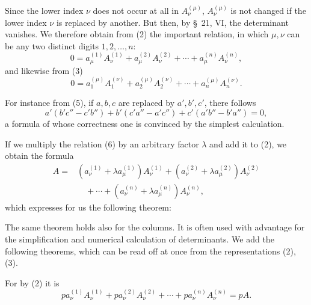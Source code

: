 
Since the lower index \(\nu\) does not occur at all in \(A_\nu^{(\mu)}\), \(A_\nu^{(\mu)}\) is not changed if the lower index \(\nu\) is replaced by another. But then, by \S~21, VI, the determinant vanishes. We therefore obtain from (2) the important relation, in which \(\mu,\nu\) can be any two distinct digits \(1,2,\ldots,n\):
\begin{equation}
0=a_\mu^{(1)}A_\nu^{(1)}+a_\mu^{(2)}A_\nu^{(2)}
 +\cdots+a_\mu^{(n)}A_\nu^{(n)},
\tag{6}
\end{equation}
and likewise from (3)
\begin{equation}
0=a_1^{(\mu)}A_1^{(\nu)}+a_2^{(\mu)}A_2^{(\nu)}
 +\cdots+a_n^{(\mu)}A_n^{(\nu)}.
\tag{7}
\end{equation}

For instance from (5), if \(a,b,c\) are replaced by \(a',b',c'\), there follows
\begin{equation}
 a'(b'c''-c'b'')+b'(c'a''-a'c'')+c'(a'b''-b'a'')=0,
\tag{8}
\end{equation}
a formula of whose correctness one is convinced by the simplest calculation.

If we multiply the relation (6) by an arbitrary factor \(\lambda\) and add it to (2), we obtain the formula
\begin{equation}
\begin{aligned}
 A={}&(a_\nu^{(1)}+\lambda a_\mu^{(1)})A_\nu^{(1)}
 +(a_\nu^{(2)}+\lambda a_\mu^{(2)})A_\nu^{(2)}\\
&\quad+\cdots+(a_\nu^{(n)}+\lambda a_\mu^{(n)})A_\nu^{(n)},
\end{aligned}
\tag{9}
\end{equation}
which expresses for us the following theorem:


The same theorem holds also for the columns. It is often used with advantage for the simplification and numerical calculation of determinants. We add the following theorems, which can be read off at once from the representations (2), (3).


For by (2) it is
\[
 p a_\nu^{(1)}A_\nu^{(1)}+p a_\nu^{(2)}A_\nu^{(2)}+\cdots+p a_\nu^{(n)}A_\nu^{(n)}=pA.
\]

